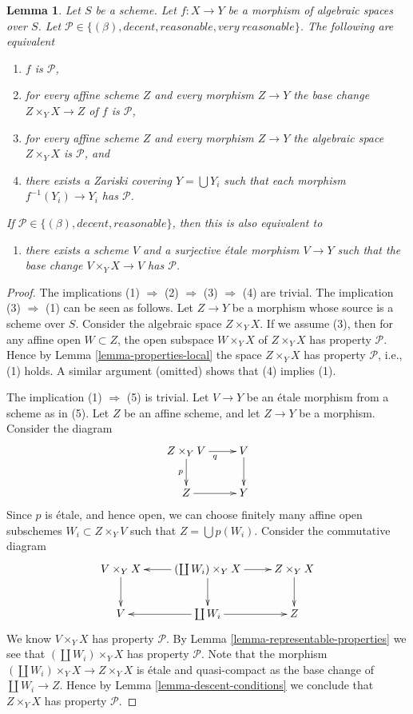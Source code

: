 \documentclass{stacks-project}
\theoremstyle{plain}
\newtheorem{lemma}[subsection]{Lemma}
\theoremstyle{definition}
\theoremstyle{remark}
\numberwithin{equation}{subsection}
\begin{document}
\begin{lemma}
\label{lemma-relative-conditions-local}
Let $S$ be a scheme.
Let $f : X \to Y$ be a morphism of algebraic spaces over $S$.
Let $\mathcal{P} \in \{(\beta), decent, reasonable, very\ reasonable\}$.
The following are equivalent
\begin{enumerate}
\item $f$ is $\mathcal{P}$,
\item for every affine scheme $Z$ and every morphism $Z \to Y$ the
base change $Z \times_Y X \to Z$ of $f$ is $\mathcal{P}$,
\item for every affine scheme $Z$ and every morphism $Z \to Y$ the
algebraic space $Z \times_Y X$ is $\mathcal{P}$, and
\item there exists a Zariski covering $Y = \bigcup Y_i$ such
that each morphism $f^{-1}(Y_i) \to Y_i$ has $\mathcal{P}$.
\end{enumerate}
If $\mathcal{P} \in \{(\beta), decent, reasonable\}$, then this is also
equivalent to
\begin{enumerate}
\item[(5)] there exists a scheme $V$ and a surjective \'etale morphism
$V \to Y$ such that the base change $V \times_Y X \to V$ has
$\mathcal{P}$.
\end{enumerate}
\end{lemma}

\begin{proof}
The implications (1) $\Rightarrow$ (2) $\Rightarrow$ (3) $\Rightarrow$ (4)
are trivial.
The implication (3) $\Rightarrow$ (1) can be seen as follows.
Let $Z \to Y$ be a morphism whose source is a scheme over $S$.
Consider the algebraic space $Z \times_Y X$. If we assume (3), then
for any affine open $W \subset Z$, the open subspace
$W \times_Y X$ of $Z \times_Y X$ has property $\mathcal{P}$. Hence by
Lemma \ref{lemma-properties-local}
the space $Z \times_Y X$ has property $\mathcal{P}$, i.e., (1) holds.
A similar argument (omitted) shows that (4) implies (1).

\medskip\noindent
The implication (1) $\Rightarrow$ (5) is trivial. Let $V \to Y$ be
an \'etale morphism from a scheme as in (5). Let $Z$ be an affine scheme,
and let $Z \to Y$ be a morphism. Consider the diagram
$$
\xymatrix{
Z \times_Y V \ar[r]_q \ar[d]_p & V \ar[d] \\
Z \ar[r] & Y
}
$$
Since $p$ is \'etale, and hence open, we can choose finitely many affine open
subschemes $W_i \subset Z \times_Y V$ such that $Z = \bigcup p(W_i)$.
Consider the commutative diagram
$$
\xymatrix{
V \times_Y X \ar[d] &
(\coprod W_i) \times_Y X \ar[l] \ar[d] \ar[r] &
Z \times_Y X \ar[d] \\
V &
\coprod W_i \ar[l] \ar[r] &
Z
}
$$
We know $V \times_Y X$ has property $\mathcal{P}$. By
Lemma \ref{lemma-representable-properties}
we see that $(\coprod W_i) \times_Y X$ has property $\mathcal{P}$.
Note that the morphism $(\coprod W_i) \times_Y X \to Z \times_Y X$
is \'etale and quasi-compact as the base change of $\coprod W_i \to Z$.
Hence by Lemma \ref{lemma-descent-conditions}
we conclude that $Z \times_Y X$ has property $\mathcal{P}$.
\end{proof}
\end{document}
